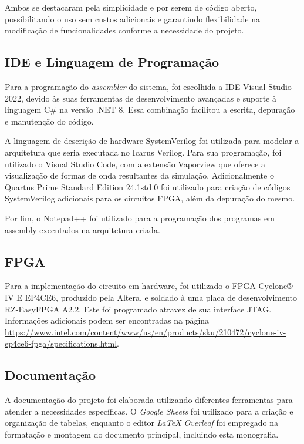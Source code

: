 \documentclass[
	12pt,				%
	openright,			%
	oneside,			%
	a4paper,			%
	english,			%
	french,				%
	spanish,			%
	brazil,				%
	]{abntex2}
\begin{document}
Ambos se destacaram pela simplicidade e por serem de código aberto, possibilitando o uso sem custos adicionais e garantindo flexibilidade na modificação de funcionalidades conforme a necessidade do projeto.

\subsection{IDE e Linguagem de Programação}
Para a programação do \textit{assembler} do sistema, foi escolhida a IDE Visual Studio 2022, devido às suas ferramentas de desenvolvimento avançadas e suporte à linguagem C\# na versão .NET 8. Essa combinação facilitou a escrita, depuração e manutenção do código.

A linguagem de descrição de hardware SystemVerilog foi utilizada para modelar a arquitetura que seria executada no Icarus Verilog. Para sua programação, foi utilizado o Visual Studio Code, com a extensão Vaporview\cite{ramseyer_vaporview_2025} que oferece a visualização de formas de onda resultantes da simulação. Adicionalmente o Quartus Prime Standard Edition 24.1std.0 foi utilizado para criação de códigos SystemVerilog adicionais para os circuitos FPGA, além da depuração do mesmo.

Por fim, o Notepad++ foi utilizado para a programação dos programas em assembly executados na arquitetura criada.

\subsection{FPGA}

Para a implementação do circuito em hardware, foi utilizado o FPGA Cyclone® IV E EP4CE6, produzido pela Altera, e soldado à uma placa de desenvolvimento RZ-EasyFPGA A2.2. Este foi programado atravez de sua interface JTAG. Informações adicionais podem ser encontradas na página \url{https://www.intel.com/content/www/us/en/products/sku/210472/cyclone-iv-ep4ce6-fpga/specifications.html}.

\subsection{Documentação}
A documentação do projeto foi elaborada utilizando diferentes ferramentas para atender a necessidades específicas. O \textit{Google Sheets} foi utilizado para a criação e organização de tabelas, enquanto o editor \textit{LaTeX Overleaf} foi empregado na formatação e montagem do documento principal, incluindo esta monografia.
\end{document}
